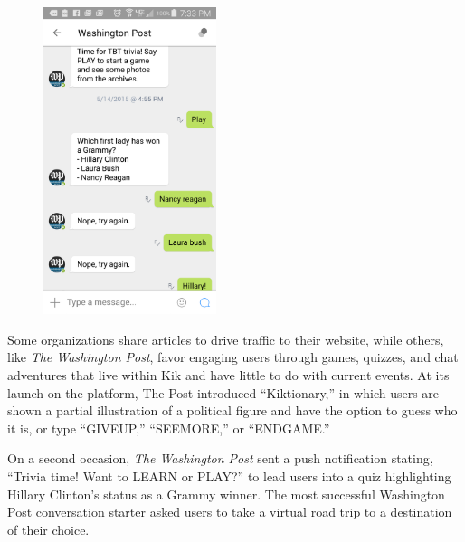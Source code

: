 \documentclass[notoc, symmetric, nobib, nols]{towcenter-guideto-book}
\begin{document}
\begin{figure}
\includegraphics[width=0.45\textwidth]{graphics/CHATAPPS_Page19_Kik2.png} 
\end{figure}

Some organizations share articles to drive traffic to their website, while others, like \textit{The Washington Post}, favor engaging users through games, quizzes, and chat adventures that live within Kik and have little to do with current events. At its launch on the platform, The Post introduced ``Kiktionary,'' in which users are shown a partial illustration of a political figure and have the option to guess who it is, or type ``GIVEUP,'' ``SEEMORE,'' or ``ENDGAME.''  

On a second occasion, \textit{The Washington Post} sent a push notification stating, ``Trivia time! Want to LEARN or PLAY?'' to lead users into a quiz highlighting Hillary Clinton's status as a Grammy winner. The most successful Washington Post conversation starter asked users to take a virtual road trip to a destination of their choice.  



\end{document}

